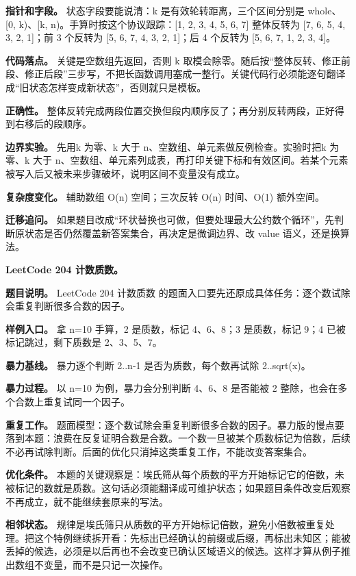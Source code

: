 \textbf{指针和字段。} 状态字段要能说清：k 是有效轮转距离，三个区间分别是 whole、[0, k)、[k, n)。手算时按这个协议跟踪：[1, 2, 3, 4, 5, 6, 7] 整体反转为 [7, 6, 5, 4, 3, 2, 1]；前 3 个反转为 [5, 6, 7, 4, 3, 2, 1]；后 4 个反转为 [5, 6, 7, 1, 2, 3, 4]。

\textbf{代码落点。} 关键是空数组先返回，否则 k 取模会除零。随后按“整体反转、修正前段、修正后段”三步写，不把长函数调用塞成一整行。关键代码行必须能逐句翻译成“旧状态怎样变成新状态”，否则就只是模板。

\textbf{正确性。} 整体反转完成两段位置交换但段内顺序反了；再分别反转两段，正好得到右移后的段顺序。

\textbf{边界实验。} 先用k 为零、k 大于 n、空数组、单元素做反例检查。实验时把k 为零、k 大于 n、空数组、单元素列成表，再打印关键下标和有效区间。若某个元素被写入后又被未来步骤破坏，说明区间不变量没有成立。

\textbf{复杂度变化。} 辅助数组 O(n) 空间；三次反转 O(n) 时间、O(1) 额外空间。

\textbf{迁移追问。} 如果题目改成“环状替换也可做，但要处理最大公约数个循环”，先判断原状态是否仍然覆盖新答案集合，再决定是微调边界、改 value 语义，还是换算法。

\noindent\textbf{LeetCode 204 计数质数。}

\textbf{题目说明。} LeetCode 204 计数质数 的题面入口要先还原成具体任务：逐个数试除会重复判断很多合数的因子。

\textbf{样例入口。} 拿 n=10 手算，2 是质数，标记 4、6、8；3 是质数，标记 9；4 已被标记跳过，剩下质数是 2、3、5、7。

\textbf{暴力基线。} 暴力逐个判断 2..n-1 是否为质数，每个数再试除 2..sqrt(x)。

\textbf{暴力过程。} 以 n=10 为例，暴力会分别判断 4、6、8 是否能被 2 整除，也会在多个合数上重复试同一个因子。

\textbf{重复工作。} 题面模型：逐个数试除会重复判断很多合数的因子。暴力版的慢点要落到本题：浪费在反复证明合数是合数。一个数一旦被某个质数标记为倍数，后续不必再试除判断。后面的优化只消掉这类重复工作，不能改变答案集合。

\textbf{优化条件。} 本题的关键观察是：埃氏筛从每个质数的平方开始标记它的倍数，未被标记的数就是质数。这句话必须能翻译成可维护状态；如果题目条件改变后观察不再成立，就不能继续套原来的写法。

\textbf{相邻状态。} 规律是埃氏筛只从质数的平方开始标记倍数，避免小倍数被重复处理。把这个特例继续拆开看：先标出已经确认的前缀或后缀，再标出未知区；能被丢掉的候选，必须是以后再也不会改变已确认区域语义的候选。这样才算从例子推出数组不变量，而不是只记一次操作。


